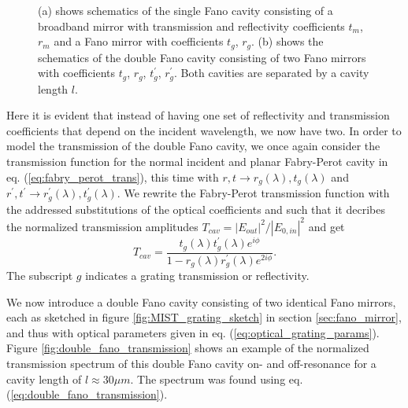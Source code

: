\begin{figure}[h!]
\begin{subfigure}[b]{0.3\textwidth}
        \caption{}
        \label{fig:double_fano_sketch}
    \end{subfigure}
    \caption{(a) shows schematics of the single Fano cavity consisting of a broadband mirror with transmission and reflectivity coefficients $t_m$, $r_m$ and a Fano mirror with coefficients $t_g$, $r_g$. (b) shows the schematics of the double Fano cavity consisting of two Fano mirrors with coefficients $t_g$, $r_g$, $t_g^{\prime}$, $r_g^{\prime}$. Both cavities are separated by a cavity length $l$.}
    \label{fig:single_and_double_fano_sketch}
\end{figure}

Here it is evident that instead of having one set of reflectivity and transmission coefficients that depend on the incident wavelength, we now have two. In order to model the transmission of the double Fano cavity, we once again consider the transmission function for the normal incident and planar Fabry-Perot cavity in eq. (\ref{eq:fabry_perot_trans}), this time with $r,t \rightarrow r_g(\lambda),t_g(\lambda)$ and $r^{\prime},t^{\prime} \rightarrow r_g^{\prime}(\lambda),t_g^{\prime}(\lambda)$\cite{Naesby}. We rewrite the Fabry-Perot transmission function with the addressed substitutions of the optical coefficients and such that it decribes the normalized transmission amplitudes $T_{cav} = |E_{out}|^2/|E_{0,in}|^2$ and get
\begin{equation}
    T_{cav} = \frac{t_g(\lambda) t_g^{\prime}(\lambda) e^{i\phi}}{1 - r_g(\lambda)r_g^{\prime}(\lambda) e^{2 i \phi}}.
    \label{eq:double_fano_transmission}
\end{equation}
The subscript $g$ indicates a grating transmission or reflectivity.

We now introduce a double Fano cavity consisting of two identical Fano mirrors, each as sketched in figure \ref{fig:MIST_grating_sketch} in section \ref{sec:fano_mirror}, and thus with optical parameters given in eq. (\ref{eq:optical_grating_params}). Figure \ref{fig:double_fano_transmission} shows an example of the normalized transmission spectrum of this double Fano cavity on- and off-resonance for a cavity length of $l \approx 30 \mu m$. The spectrum was found using eq. (\ref{eq:double_fano_transmission}).

